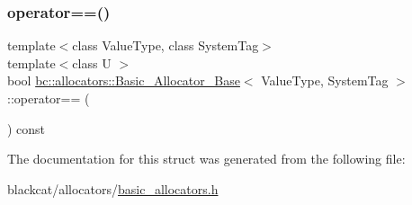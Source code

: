\mbox{\label{structbc_1_1allocators_1_1Basic__Allocator__Base_ab70dcd6aa078ce7b3d5a43c36397d8e9}} 
\subsubsection{\texorpdfstring{operator==()}{operator==()}}
{\footnotesize\ttfamily template$<$class Value\+Type, class System\+Tag$>$ \\
template$<$class U $>$ \\
bool \hyperlink{structbc_1_1allocators_1_1Basic__Allocator__Base}{bc\+::allocators\+::\+Basic\+\_\+\+Allocator\+\_\+\+Base}$<$ Value\+Type, System\+Tag $>$\+::operator== (\begin{DoxyParamCaption}\item[{const \hyperlink{structbc_1_1allocators_1_1Basic__Allocator__Base}{Basic\+\_\+\+Allocator\+\_\+\+Base}$<$ U, System\+Tag $>$ \&}]{ }\end{DoxyParamCaption}) const\hspace{0.3cm}{\ttfamily [inline]}}



The documentation for this struct was generated from the following file\+:\begin{DoxyCompactItemize}
\item 
blackcat/allocators/\hyperlink{basic__allocators_8h}{basic\+\_\+allocators.\+h}\end{DoxyCompactItemize}
